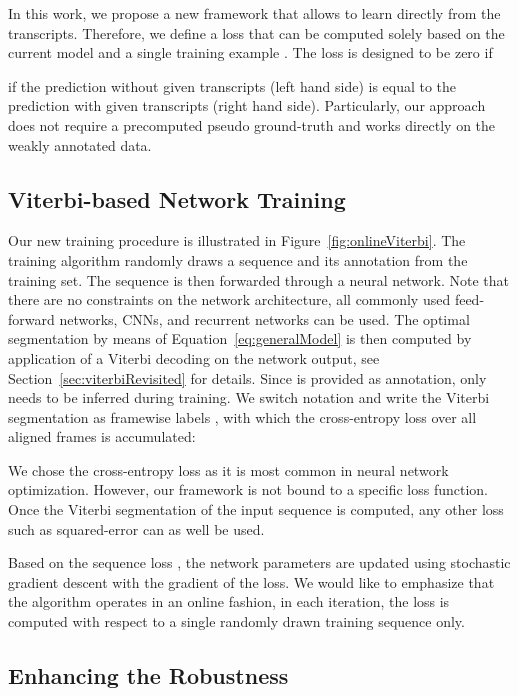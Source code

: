 \documentclass[10pt,twocolumn,letterpaper]{article}
\begin{document}
In this work, we propose a new framework that allows to learn directly from the
transcripts. Therefore, we define a loss that can be computed solely based on the
current model and a single training example .
The loss is designed to be zero if

\ie if the prediction without given transcripts (left hand side) is equal to the prediction
with given transcripts (right hand side).
Particularly, our approach does not require a precomputed pseudo ground-truth and works
directly on the weakly annotated data.


\subsection{Viterbi-based Network Training}
\label{sec:Viterbi}

Our new training procedure is illustrated in Figure~\ref{fig:onlineViterbi}.
The training algorithm randomly draws a sequence 
and its annotation  from the training set. The sequence is then
forwarded through a neural network. Note that there are no constraints on the network
architecture, all commonly used feed-forward networks, CNNs, and recurrent networks
can be used.
The optimal segmentation by means of Equation~\eqref{eq:generalModel} is then
computed by application of a Viterbi decoding on the network output, see Section~\ref{sec:viterbiRevisited}
for details. Since  is provided as annotation, only  needs
to be inferred during training.
We switch notation and write the Viterbi segmentation 
as framewise labels , with which the cross-entropy loss over all aligned frames
is accumulated:

We chose the cross-entropy loss as it is most common in neural network
optimization. However, our framework is not bound to a specific loss function.
Once the Viterbi segmentation of the input sequence is computed, any other
loss such as squared-error can as well be used.

Based on the sequence loss , the network parameters are updated
using stochastic gradient descent with the gradient  of the
loss. We would like to emphasize that the algorithm operates in an online fashion,
\ie in each iteration, the loss  is computed with respect to a single
randomly drawn training sequence  only.


\subsection{Enhancing the Robustness}
\label{sec:robust}
\end{document}
